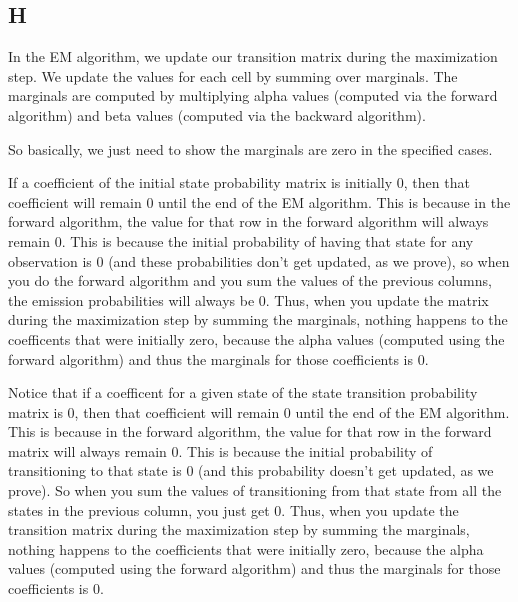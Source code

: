 \documentclass{article}
\begin{document}
\subsection*{H}
In the EM algorithm, we update our transition matrix during the maximization step.
We update the values for each cell by summing over marginals.
The marginals are computed by multiplying alpha values (computed via the forward algorithm) and
beta values (computed via the backward algorithm).

So basically, we just need to show the marginals are zero in the specified cases.

If a coefficient of the initial state probability matrix is initially 0, then
that coefficient will remain 0 until the end of the EM algorithm. This is because
in the forward algorithm, the value for that row in the forward algorithm will
always remain 0. This is because the initial probability of having that state
for any observation is 0 (and these probabilities don't get updated, as we prove),
so when you do the forward algorithm and you sum
the values of the previous columns, the emission probabilities will always be
0. Thus, when you update the matrix during the maximization step by summing
the marginals, nothing happens to the coefficents that were initially zero,
because the alpha values (computed using the forward algorithm) and thus the
marginals for those coefficients is 0.

Notice that if a coefficent for a given state of the state transition probability
matrix is 0, then that coefficient will remain 0 until the end of the EM algorithm. This is because
in the forward algorithm, the value for that row in the forward matrix will always
remain 0. This is because the initial probability of transitioning to that state is 0
(and this probability doesn't get updated, as we prove). So when
you sum the values of transitioning from that state from all the states in the previous
column, you just get 0. Thus, when you update the transition matrix during the
maximization step by summing the marginals, nothing happens to the coefficients
that were initially zero, because the alpha values (computed using the forward algorithm)
and thus the marginals for those coefficients is 0.
\end{document}

